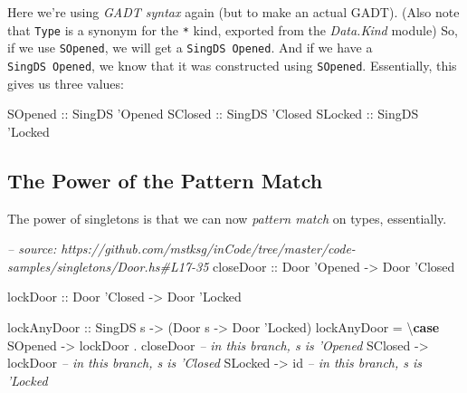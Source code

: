 \documentclass[]{article}
\newenvironment{Shaded}{}{}
\newcommand{\KeywordTok}[1]{\textcolor[rgb]{0.00,0.44,0.13}{\textbf{#1}}}
\newcommand{\DataTypeTok}[1]{\textcolor[rgb]{0.56,0.13,0.00}{#1}}
\newcommand{\CharTok}[1]{\textcolor[rgb]{0.25,0.44,0.63}{#1}}
\newcommand{\CommentTok}[1]{\textcolor[rgb]{0.38,0.63,0.69}{\textit{#1}}}
\newcommand{\OtherTok}[1]{\textcolor[rgb]{0.00,0.44,0.13}{#1}}
\newcommand{\FunctionTok}[1]{\textcolor[rgb]{0.02,0.16,0.49}{#1}}
\newcommand{\NormalTok}[1]{#1}
\begin{document}
Here we're using \emph{GADT syntax} again (but to make an actual GADT). (Also
note that \texttt{Type} is a synonym for the \texttt{*} kind, exported from the
\emph{Data.Kind} module) So, if we use \texttt{SOpened}, we will get a
\texttt{SingDS\ \textquotesingle{}Opened}. And if we have a
\texttt{SingDS\ \textquotesingle{}Opened}, we know that it was constructed using
\texttt{SOpened}. Essentially, this gives us three values:

\begin{Shaded}
\begin{Highlighting}[]
\DataTypeTok{SOpened}\OtherTok{ ::} \DataTypeTok{SingDS} \CharTok{'Opened}
\DataTypeTok{SClosed}\OtherTok{ ::} \DataTypeTok{SingDS} \CharTok{'Closed}
\DataTypeTok{SLocked}\OtherTok{ ::} \DataTypeTok{SingDS} \CharTok{'Locked}
\end{Highlighting}
\end{Shaded}

\subsection{The Power of the Pattern
Match}\label{the-power-of-the-pattern-match}

The power of singletons is that we can now \emph{pattern match} on types,
essentially.

\begin{Shaded}
\begin{Highlighting}[]
\CommentTok{-- source: https://github.com/mstksg/inCode/tree/master/code-samples/singletons/Door.hs#L17-35}
\OtherTok{closeDoor ::} \DataTypeTok{Door} \CharTok{'Opened -> Door '}\DataTypeTok{Closed}

\OtherTok{lockDoor ::} \DataTypeTok{Door} \CharTok{'Closed -> Door '}\DataTypeTok{Locked}

\OtherTok{lockAnyDoor ::} \DataTypeTok{SingDS}\NormalTok{ s }\OtherTok{->}\NormalTok{ (}\DataTypeTok{Door}\NormalTok{ s }\OtherTok{->} \DataTypeTok{Door} \CharTok{'Locked)}
\NormalTok{lockAnyDoor }\FunctionTok{=}\NormalTok{ \textbackslash{}}\KeywordTok{case}
    \DataTypeTok{SOpened} \OtherTok{->}\NormalTok{ lockDoor }\FunctionTok{.}\NormalTok{ closeDoor  }\CommentTok{-- in this branch, s is 'Opened}
    \DataTypeTok{SClosed} \OtherTok{->}\NormalTok{ lockDoor              }\CommentTok{-- in this branch, s is 'Closed}
    \DataTypeTok{SLocked} \OtherTok{->}\NormalTok{ id                    }\CommentTok{-- in this branch, s is 'Locked}
\end{Highlighting}
\end{Shaded}
\end{document}
